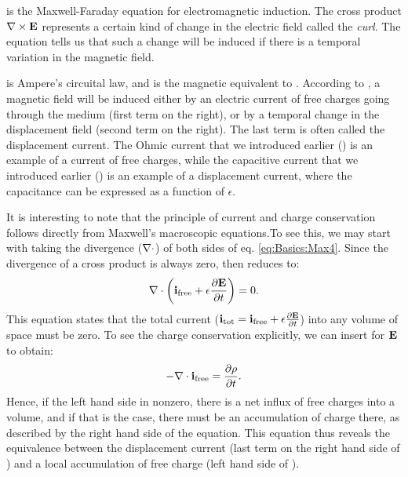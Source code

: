  is the Maxwell-Faraday equation for electromagnetic induction. The cross product ${\bf \nabla} \times {\bf E}$ represents a certain kind of change in the electric field called the \textit{curl}. The equation tells us that such a change will be induced if there is a temporal variation in the magnetic field.

 is Ampere's circuital law, and is the magnetic equivalent to . According to , a magnetic field will be induced either by an electric current of free charges going through the medium (first term on the right), or by a temporal change in the displacement field (second term on the right). The last term is often called the displacement current. The Ohmic current that we introduced earlier () is an example of a current of free charges, while the capacitive current that we introduced earlier () is an example of a displacement current, where the capacitance can be expressed as a function of $\epsilon$.

It is interesting to note that the principle of current and charge conservation follows directly from Maxwell's macroscopic equations.To see this, we may start with taking the divergence (${\bf \nabla} \cdot$) of both sides of eq. \ref{eq:Basics:Max4}. Since the divergence of a cross product is always zero,  then reduces to:
\begin{equation}
{\bf \nabla} \cdot \left( {\bf i}_\text{free} +  \epsilon \frac{\partial {\bf E}}{\partial t} \right) = 0.
\label{eq:Basics:Max4dot}
\end{equation}
This equation states that the total current (${\bf i}_\text{tot} = {\bf i}_\text{free} +  \epsilon \frac{\partial {\bf E}}{\partial t}$) into any volume of space must be zero. To see the charge conservation explicitly, we can insert  for ${\bf E}$ to obtain:
\begin{equation}
- {\bf \nabla} \cdot {\bf i}_\text{free} =  \frac{\partial \rho}{\partial t}.
\label{eq:Basics:currentconservation}
\end{equation}
Hence, if the left hand side in nonzero, there is a net influx of free charges into a volume, and if that is the case, there must be an accumulation of charge there, as described by the right hand side of the equation. This equation thus reveals the equivalence between the displacement current (last term on the right hand side of ) and a local accumulation of free charge (left hand side of ).


